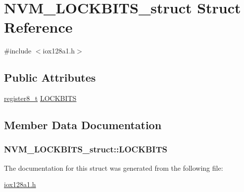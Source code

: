 \hypertarget{struct_n_v_m___l_o_c_k_b_i_t_s__struct}{
\section{NVM\_\-LOCKBITS\_\-struct Struct Reference}
\label{struct_n_v_m___l_o_c_k_b_i_t_s__struct}
}


{\ttfamily \#include $<$iox128a1.h$>$}

\subsection*{Public Attributes}
\begin{DoxyCompactItemize}
\item 
\hyperlink{iox128a1_8h_a6a0649252b392263406882923b04a9db}{register8\_\-t} \hyperlink{struct_n_v_m___l_o_c_k_b_i_t_s__struct_a3bd784aa75e0181cde2a80a2df3b83a7}{LOCKBITS}
\end{DoxyCompactItemize}


\subsection{Member Data Documentation}
\hypertarget{struct_n_v_m___l_o_c_k_b_i_t_s__struct_a3bd784aa75e0181cde2a80a2df3b83a7}{
\subsubsection[{LOCKBITS}]{ {\bf NVM\_\-LOCKBITS\_\-struct::LOCKBITS}}}
\label{struct_n_v_m___l_o_c_k_b_i_t_s__struct_a3bd784aa75e0181cde2a80a2df3b83a7}


The documentation for this struct was generated from the following file:\begin{DoxyCompactItemize}
\item 
\hyperlink{iox128a1_8h}{iox128a1.h}\end{DoxyCompactItemize}
